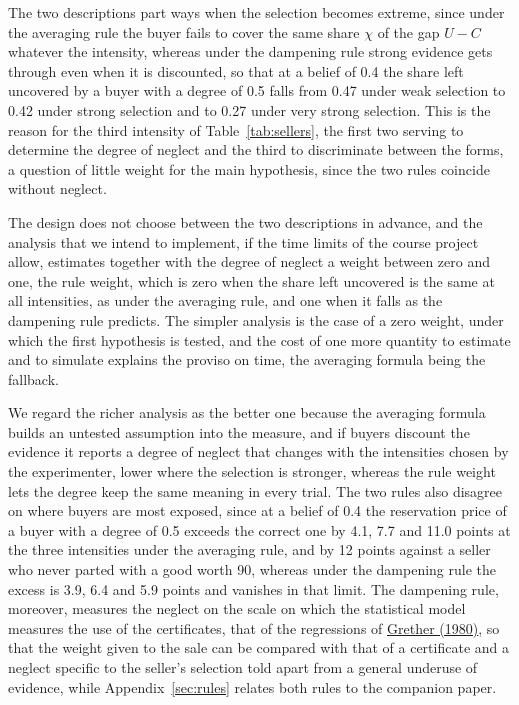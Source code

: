 \documentclass[11pt,a4paper]{article}
\newcommand{\cy}[2]{\hyperlink{cite.#1}{\textcolor{citecolor}{#2}}}
\begin{document}
The two descriptions part ways when the selection becomes extreme, since under the averaging rule the buyer fails to cover the same share $\chi$ of the gap $U-C$ whatever the intensity, whereas under the dampening rule strong evidence gets through even when it is discounted, so that at a belief of 0.4 the share left uncovered by a buyer with a degree of 0.5 falls from 0.47 under weak selection to 0.42 under strong selection and to 0.27 under very strong selection. This is the reason for the third intensity of Table~\ref{tab:sellers}, the first two serving to determine the degree of neglect and the third to discriminate between the forms, a question of little weight for the main hypothesis, since the two rules coincide without neglect.

The design does not choose between the two descriptions in advance, and the analysis that we intend to implement, if the time limits of the course project allow, estimates together with the degree of neglect a weight between zero and one, the rule weight, which is zero when the share left uncovered is the same at all intensities, as under the averaging rule, and one when it falls as the dampening rule predicts. The simpler analysis is the case of a zero weight, under which the first hypothesis is tested, and the cost of one more quantity to estimate and to simulate explains the proviso on time, the averaging formula being the fallback.

We regard the richer analysis as the better one because the averaging formula builds an untested assumption into the measure, and if buyers discount the evidence it reports a degree of neglect that changes with the intensities chosen by the experimenter, lower where the selection is stronger, whereas the rule weight lets the degree keep the same meaning in every trial. The two rules also disagree on where buyers are most exposed, since at a belief of 0.4 the reservation price of a buyer with a degree of 0.5 exceeds the correct one by 4.1, 7.7 and 11.0 points at the three intensities under the averaging rule, and by 12 points against a seller who never parted with a good worth 90, whereas under the dampening rule the excess is 3.9, 6.4 and 5.9 points and vanishes in that limit. The dampening rule, moreover, measures the neglect on the scale on which the statistical model measures the use of the certificates, that of the regressions of \cy{grether}{Grether (1980)}, so that the weight given to the sale can be compared with that of a certificate and a neglect specific to the seller's selection told apart from a general underuse of evidence, while Appendix~\ref{sec:rules} relates both rules to the companion paper.
\end{document}

